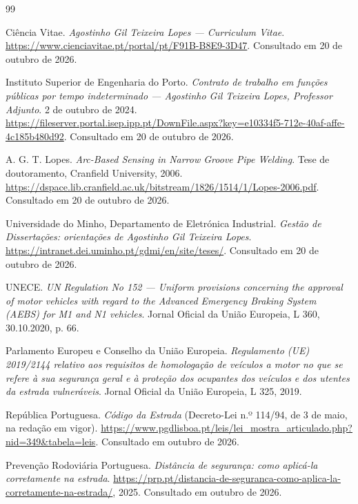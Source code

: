 
\begin{thebibliography}{99}
\raggedright
{}
 Ciência Vitae. \emph{Agostinho Gil Teixeira Lopes — Curriculum Vitae}. \url{https://www.cienciavitae.pt/portal/pt/F91B-B8E9-3D47}. Consultado em 20 de outubro de 2026.

 Instituto Superior de Engenharia do Porto. \emph{Contrato de trabalho em funções públicas por tempo indeterminado — Agostinho Gil Teixeira Lopes, Professor Adjunto}. 2 de outubro de 2024. \url{https://fileserver.portal.isep.ipp.pt/DownFile.aspx?key=e10334f5-712e-40af-affe-4c185b480d92}. Consultado em 20 de outubro de 2026.

 A. G. T. Lopes. \emph{Arc-Based Sensing in Narrow Groove Pipe Welding}. Tese de doutoramento, Cranfield University, 2006. \url{https://dspace.lib.cranfield.ac.uk/bitstream/1826/1514/1/Lopes-2006.pdf}. Consultado em 20 de outubro de 2026.

 Universidade do Minho, Departamento de Eletrónica Industrial. \emph{Gestão de Dissertações: orientações de Agostinho Gil Teixeira Lopes}. \url{https://intranet.dei.uminho.pt/gdmi/en/site/teses/}. Consultado em 20 de outubro de 2026.

 UNECE. \emph{UN Regulation No 152 — Uniform provisions concerning the approval of motor vehicles with regard to the Advanced Emergency Braking System (AEBS) for M1 and N1 vehicles}. Jornal Oficial da União Europeia, L 360, 30.10.2020, p. 66.

 Parlamento Europeu e Conselho da União Europeia. \emph{Regulamento (UE) 2019/2144 relativo aos requisitos de homologação de veículos a motor no que se refere à sua segurança geral e à proteção dos ocupantes dos veículos e dos utentes da estrada vulneráveis}. Jornal Oficial da União Europeia, L 325, 2019.

 República Portuguesa. \emph{Código da Estrada} (Decreto-Lei n.º 114/94, de 3 de maio, na redação em vigor). \url{https://www.pgdlisboa.pt/leis/lei_mostra_articulado.php?nid=349&tabela=leis}. Consultado em outubro de 2026.

 Prevenção Rodoviária Portuguesa. \emph{Distância de segurança: como aplicá-la corretamente na estrada}. \url{https://prp.pt/distancia-de-seguranca-como-aplica-la-corretamente-na-estrada/}, 2025. Consultado em outubro de 2026.


\end{thebibliography}
